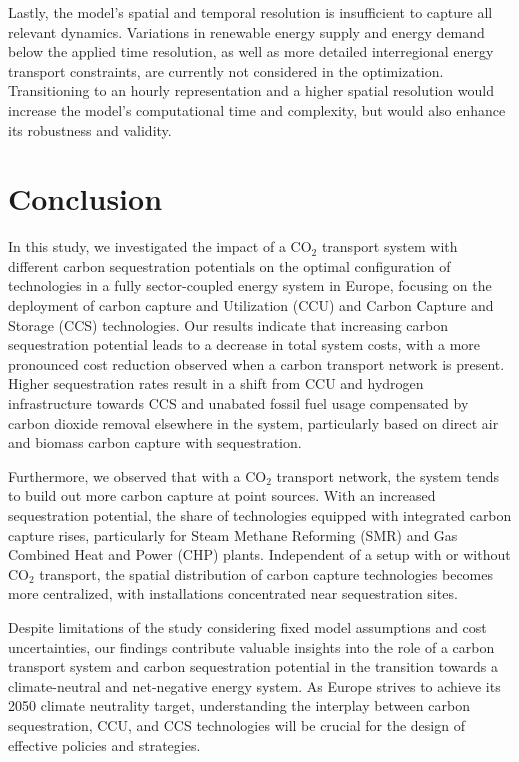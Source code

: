 \documentclass[twocolumn]{article}
\newcommand{\carbon}{CO$_2$}
\begin{document}
Lastly, the model's spatial and temporal resolution is insufficient to capture all relevant dynamics. Variations in renewable energy supply and energy demand below the applied time resolution, as well as more detailed interregional energy transport constraints, are currently not considered in the optimization. Transitioning to an hourly representation and a higher spatial resolution would increase the model's computational time and complexity, but would also enhance its robustness and validity.

\section{Conclusion}
\label{sec:conclusion}

In this study, we investigated the impact of a \carbon{} transport system with different carbon sequestration potentials on the optimal configuration of technologies in a fully sector-coupled energy system in Europe, focusing on the deployment of carbon capture and Utilization (CCU) and Carbon Capture and Storage (CCS) technologies. Our results indicate that increasing carbon sequestration potential leads to a decrease in total system costs, with a more pronounced cost reduction observed when a carbon transport network is present. Higher sequestration rates result in a shift from CCU and hydrogen infrastructure towards CCS and unabated fossil fuel usage compensated by carbon dioxide removal elsewhere in the system, particularly based on direct air and biomass carbon capture with sequestration.

Furthermore, we observed that with a \carbon{} transport network, the system tends to build out more carbon capture at point sources. With an increased sequestration potential, the share of technologies equipped with integrated carbon capture rises, particularly for Steam Methane Reforming (SMR) and Gas Combined Heat and Power (CHP) plants. Independent of a setup with or without \carbon{} transport, the spatial distribution of carbon capture technologies becomes more centralized, with installations concentrated near sequestration sites.

Despite limitations of the study considering fixed model assumptions and cost uncertainties, our findings contribute valuable insights into the role of a carbon transport system and carbon sequestration potential in the transition towards a climate-neutral and net-negative energy system. As Europe strives to achieve its 2050 climate neutrality target, understanding the interplay between carbon sequestration, CCU, and CCS technologies will be crucial for the design of effective policies and strategies.
\end{document}
